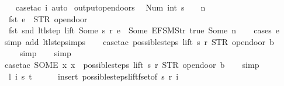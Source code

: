 \begin{isabellebody}
\ \ \isamarkupfalse%
\ {\isacharparenleft}case{\isacharunderscore}tac\ i{\isacharcomma}\ auto{\isacharparenright}%
\endisatagproof
{\isafoldproof}%
%
\isadelimproof
\isanewline
%
\endisadelimproof
\isanewline
{}\isamarkupfalse%
\ output{\isacharunderscore}opendoors{\isacharcolon}\isanewline
\ \ {\isachardoublequoteopen}Num\ {\isacharparenleft}int\ {\isacharparenleft}s\ {\isacharminus}\ {}{\isacharparenright}{\isacharparenright}\ {\isasymnoteq}\ n\ {\isasymLongrightarrow}\isanewline
\ \ fst\ e\ {\isacharequal}\ STR\ {\isacharprime}{\isacharprime}opendoor{\isacharprime}{\isacharprime}\ {\isasymLongrightarrow}\isanewline
\ \ fst\ {\isacharparenleft}snd\ {\isacharparenleft}ltl{\isacharunderscore}step\ lift\ {\isacharparenleft}Some\ s{\isacharparenright}\ r\ e{\isacharparenright}{\isacharparenright}\ {\isasymnoteq}\ {\isacharbrackleft}Some\ {\isacharparenleft}EFSM{\isachardot}Str\ {\isacharprime}{\isacharprime}true{\isacharprime}{\isacharprime}{\isacharparenright}{\isacharcomma}\ Some\ n{\isacharbrackright}{\isachardoublequoteclose}\isanewline
%
\isadelimproof
\ \ %
\endisadelimproof
%
\isatagproof
{}\isamarkupfalse%
\ {\isacharparenleft}cases\ e{\isacharparenright}\isanewline
\ \ \isamarkupfalse%
\ {\isacharparenleft}simp\ add{\isacharcolon}\ ltl{\isacharunderscore}step{\isachardot}simps{\isacharparenright}\isanewline
\ \ \isamarkupfalse%
\ {\isacharparenleft}case{\isacharunderscore}tac\ {\isachardoublequoteopen}possible{\isacharunderscore}steps\ lift\ s\ r\ STR\ {\isacharprime}{\isacharprime}opendoor{\isacharprime}{\isacharprime}\ b\ {\isacharequal}\ {\isacharbraceleft}{\isacharbar}{\isacharbar}{\isacharbraceright}{\isachardoublequoteclose}{\isacharparenright}\isanewline
\ \ \ \isamarkupfalse%
\ simp\isanewline
\ \ \isamarkupfalse%
\ simp\isanewline
\ \ \isamarkupfalse%
\ {\isacharparenleft}case{\isacharunderscore}tac\ {\isachardoublequoteopen}SOME\ x{\isachardot}\ x\ {\isacharbar}{\isasymin}{\isacharbar}\ possible{\isacharunderscore}steps\ lift\ s\ r\ STR\ {\isacharprime}{\isacharprime}opendoor{\isacharprime}{\isacharprime}\ b{\isachardoublequoteclose}{\isacharparenright}\isanewline
\ \ \isamarkupfalse%
\ simp\isanewline
\ \ \isamarkupfalse%
\ \ l\ i\ s{\isacharprime}\ t\isanewline
\ \ \ \ \isamarkupfalse%
\ {\isacharparenleft}insert\ possible{\isacharunderscore}steps{\isacharunderscore}lift{\isacharunderscore}fset{\isacharbrackleft}of\ s\ r\ i{\isacharbrackright}{\isacharparenright}\isanewline

\end{isabellebody}
